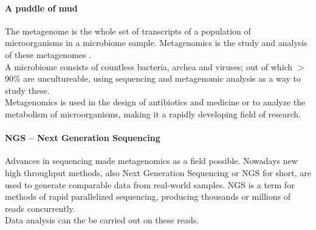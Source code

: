 \documentclass[twocolumn]{bmcart}%
\begin{document}
\paragraph*{A puddle of mud}
The metagenome is the whole set of transcripts of a population of microorganisms in a microbiome sample. Metagenomics is the study and analysis of these metagenomes \cite{handelsman2004metagenomics}.\\
A microbiome consists of countless bacteria, archea and viruses; out of which $>$90\% are uncultureable, using sequencing and metagenomic analysis as a way to study these.\\
Metagenomics is used in the design of antibiotics and medicine or to analyze the metabolism of microorganisms, making it a rapidly developing field of research.\\

\paragraph*{NGS -- Next Generation Sequencing}
Advances in sequencing made metagenomics as a field possible.
Nowadays new high throughput methods, also Next Generation Sequencing or NGS for short, are used to generate comparable data from real-world samples. NGS is a term for methods of rapid parallelized sequencing, producing thousands or millions of reads concurrently.\\
 Data analysis can the be carried out on these reads.
\end{document}
